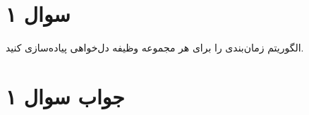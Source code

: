 \section*{سوال ۱}

الگوریتم زمان‌بندی
را برای هر مجموعه وظیفه
دل‌خواهی پیاده‌سازی کنید.

\section*{جواب سوال ۱}

